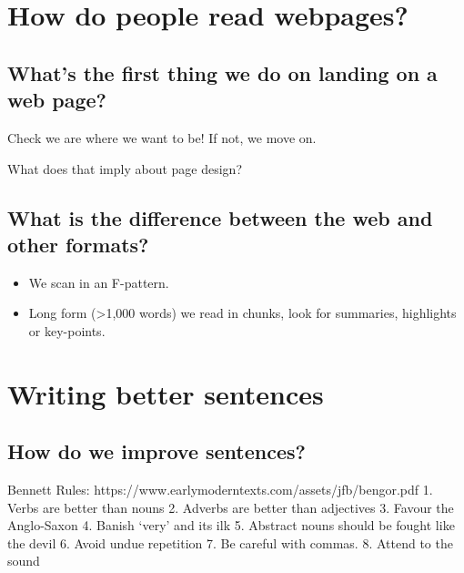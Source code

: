 \documentclass[
  letterpaper,
  DIV=11,
  numbers=noendperiod]{scrreprt}
\begin{document}

\hypertarget{how-do-people-read-webpages}{%
\chapter{How do people read
webpages?}\label{how-do-people-read-webpages}}

\hypertarget{whats-the-first-thing-we-do-on-landing-on-a-web-page}{%
\section{What's the first thing we do on landing on a web
page?}\label{whats-the-first-thing-we-do-on-landing-on-a-web-page}}

Check we are where we want to be! If not, we move on.

What does that imply about page design?

\hypertarget{what-is-the-difference-between-the-web-and-other-formats}{%
\section{What is the difference between the web and other
formats?}\label{what-is-the-difference-between-the-web-and-other-formats}}

\begin{itemize}
\item
  We scan in an F-pattern.
\item
  Long form (\textgreater1,000 words) we read in chunks, look for
  summaries, highlights or key-points.
\end{itemize}


\hypertarget{writing-better-sentences}{%
\chapter{Writing better sentences}\label{writing-better-sentences}}

\hypertarget{how-do-we-improve-sentences}{%
\section{How do we improve
sentences?}\label{how-do-we-improve-sentences}}

Bennett Rules: https://www.earlymoderntexts.com/assets/jfb/bengor.pdf 1.
Verbs are better than nouns 2. Adverbs are better than adjectives 3.
Favour the Anglo-Saxon 4. Banish `very' and its ilk 5. Abstract nouns
should be fought like the devil 6. Avoid undue repetition 7. Be careful
with commas. 8. Attend to the sound
\end{document}

